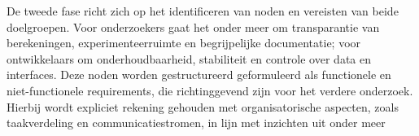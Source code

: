 De tweede fase richt zich op het identificeren van noden en vereisten van beide doelgroepen. Voor onderzoekers gaat het onder meer om transparantie van berekeningen, experimenteerruimte en begrijpelijke documentatie; voor ontwikkelaars om onderhoudbaarheid, stabiliteit en controle over data en interfaces. Deze noden worden gestructureerd geformuleerd als functionele en niet-functionele requirements, die richtinggevend zijn voor het verdere onderzoek. Hierbij wordt expliciet rekening gehouden met organisatorische aspecten, zoals taakverdeling en communicatiestromen, in lijn met inzichten uit onder meer \text
{}
